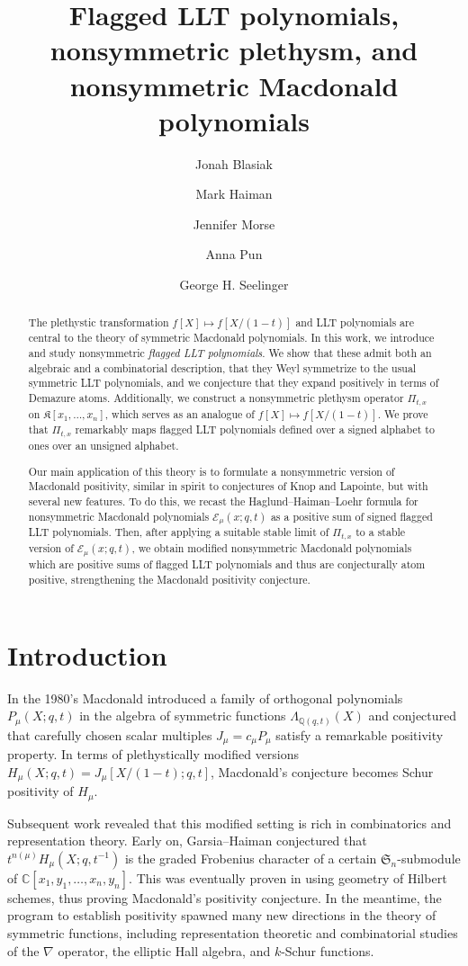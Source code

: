 \documentclass[12pt]{amsart}
\title[Flagged LLT polynomials and nonsymmetric plethysm] {Flagged LLT
polynomials, nonsymmetric plethysm, and nonsymmetric Macdonald polynomials}
\author[Blasiak]{Jonah Blasiak}
\author[Haiman]{Mark Haiman}
\author[Morse]{Jennifer Morse}
\author[Pun]{Anna Pun}
\author[Seelinger]{George H. Seelinger}
\theoremstyle{definition}
\theoremstyle{remark}
\newcommand{\QQ}{{\mathbb Q}}
\newcommand{\CC}{{\mathbb C}}
\newcommand{\Sfrak}{{\mathfrak S}}
\begin{document}
\begin{abstract}
The plethystic transformation $f[X] \mapsto f[X/(1-t)]$ and LLT
polynomials are central to the theory of symmetric Macdonald
polynomials.  In this work, we introduce and study nonsymmetric
\emph{flagged LLT polynomials}.  We show that these admit both an
algebraic and a combinatorial description, that they Weyl symmetrize
to the usual symmetric LLT polynomials, and we conjecture that they
expand positively in terms of Demazure atoms.  Additionally, we
construct a nonsymmetric plethysm operator $\Pi_{t,x}$ on
$\mathfrak{K}[x_1,\ldots,x_n]$, which serves as an analogue of $f[X]
\mapsto f[X/(1-t)]$.  We prove that $\Pi_{t,x}$ remarkably maps
flagged LLT polynomials defined over a signed alphabet to ones over an
unsigned alphabet.


Our main application of this theory is to formulate a nonsymmetric
version of Macdonald positivity, similar in spirit to conjectures of
Knop and Lapointe, but with several new features.  To do this, we
recast the Haglund--Haiman--Loehr formula for nonsymmetric Macdonald
polynomials $\mathcal{E}_{\mu }(x;q,t)$ as a positive sum of signed flagged
LLT polynomials.  
Then, after applying a suitable stable limit of
$\Pi_{t,x}$ to a stable version of $\mathcal{E}_{\mu }(x;q,t)$,
we obtain modified nonsymmetric
Macdonald polynomials which are positive sums of flagged LLT
polynomials and thus are conjecturally atom positive, strengthening the
Macdonald positivity conjecture.
\end{abstract}
\maketitle


\section{Introduction} \label{s:intro} In the 1980's Macdonald
\cite{Macdonald88} introduced a family of orthogonal polynomials
$P_\mu(X;q,t)$ in the algebra of symmetric functions
$\Lambda_{\QQ(q,t)}(X)$ and conjectured that carefully chosen scalar
multiples $J_\mu = c_\mu P_\mu$ satisfy a remarkable positivity
property.  In terms of plethystically modified versions $H_\mu(X;q,t)
= J_\mu[X/(1-t);q,t]$, Macdonald's conjecture becomes Schur positivity
of $H_\mu$.

Subsequent work revealed that this modified setting is rich in
combinatorics and representation theory.  Early on, Garsia--Haiman
\cite{GarsiaHaiman93} conjectured that $t^{n(\mu)} H_\mu(X;q,t^{-1})$
is the graded Frobenius character of a certain $\Sfrak_n$-submodule of
$\CC[x_{1}, y_{1}, \ldots, x_{n}, y_{n}]$.  This was eventually proven
in \cite{Haiman01} using geometry of Hilbert schemes, thus proving
Macdonald's positivity conjecture.  In the meantime, the program to
establish positivity spawned many new directions in the theory of
symmetric functions, including representation theoretic and
combinatorial studies of the $\nabla$ operator, the elliptic Hall
algebra, and $k$-Schur functions.
\end{document}
